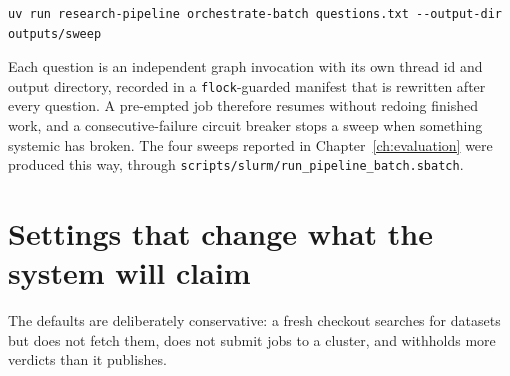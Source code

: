 \begin{lstlisting}[language={}]
uv run research-pipeline orchestrate-batch questions.txt --output-dir outputs/sweep
\end{lstlisting}

Each question is an independent graph invocation with its own thread id and
output directory, recorded in a \texttt{flock}-guarded manifest that is
rewritten after every question. A pre-empted job therefore resumes without
redoing finished work, and a consecutive-failure circuit breaker stops a sweep
when something systemic has broken. The four sweeps reported in
Chapter~\ref{ch:evaluation} were produced this way, through
\texttt{scripts/slurm/run\_pipeline\_batch.sbatch}.

\section*{Settings that change what the system will claim}

The defaults are deliberately conservative: a fresh checkout searches for
datasets but does not fetch them, does not submit jobs to a cluster, and
withholds more verdicts than it publishes.


